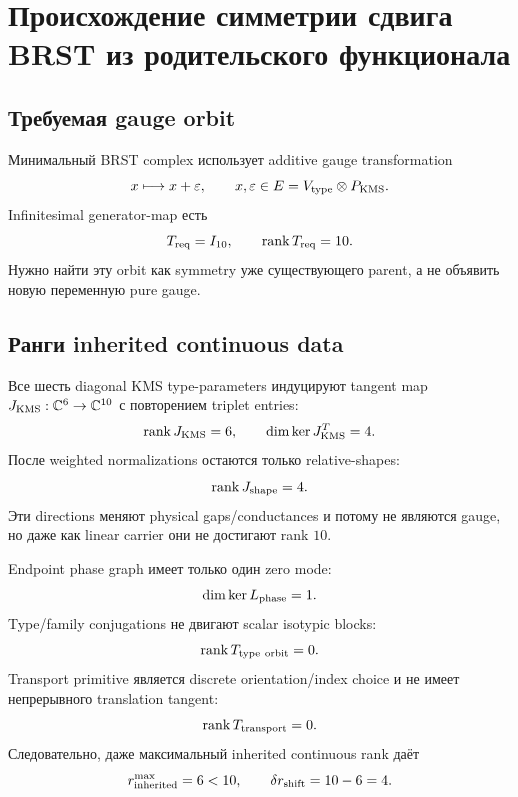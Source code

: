 \chapter{Происхождение симметрии сдвига BRST из родительского функционала}
\label{ch:v9-kms-brst-shift-origin}

\section{Требуемая gauge orbit}

Минимальный BRST complex использует additive gauge transformation
\begin{equation}
 x\longmapsto x+\varepsilon,
 \qquad
 x,\varepsilon\in E=V_{\rm type}\otimes P_{\rm KMS}.
 \label{eq:v9-kms-brst-shift-action}
\end{equation}
Infinitesimal generator-map есть
\begin{equation}
 T_{\rm req}=I_{10},
 \qquad
 \operatorname{rank} T_{\rm req}=10.
 \label{eq:v9-kms-brst-shift-required-rank}
\end{equation}
Нужно найти эту orbit как symmetry уже существующего parent, а не
объявить новую переменную pure gauge.

\section{Ранги inherited continuous data}

Все шесть diagonal KMS type-parameters индуцируют tangent map
$J_{\rm KMS}:\mathbb C^6\to\mathbb C^{10}$ с повторением triplet entries:
\begin{equation}
 \operatorname{rank} J_{\rm KMS}=6,
 \qquad
 \dim\ker J_{\rm KMS}^{T}=4.
 \label{eq:v9-kms-brst-shift-kms-rank}
\end{equation}
После weighted normalizations остаются только relative-shapes:
\begin{equation}
 \operatorname{rank} J_{\rm shape}=4.
 \label{eq:v9-kms-brst-shift-shape-rank}
\end{equation}
Эти directions меняют physical gaps/conductances и потому не являются
gauge, но даже как linear carrier они не достигают rank $10$.

Endpoint phase graph имеет только один zero mode:
\begin{equation}
 \dim\ker L_{\rm phase}=1.
 \label{eq:v9-kms-brst-shift-phase-nullity}
\end{equation}
Type/family conjugations не двигают scalar isotypic blocks:
\begin{equation}
 \operatorname{rank} T_{\rm type\ orbit}=0.
 \label{eq:v9-kms-brst-shift-type-orbit}
\end{equation}
Transport primitive является discrete orientation/index choice и не имеет
непрерывного translation tangent:
\begin{equation}
 \operatorname{rank} T_{\rm transport}=0.
 \label{eq:v9-kms-brst-shift-transport-rank}
\end{equation}
Следовательно, даже максимальный inherited continuous rank даёт
\begin{equation}
 r_{\rm inherited}^{\max}=6<10,
 \qquad
 \delta r_{\rm shift}=10-6=4.
 \label{eq:v9-kms-brst-shift-rank-deficit}
\end{equation}

